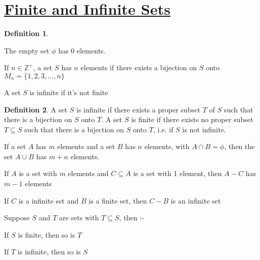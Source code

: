 \documentclass{article}
\theoremstyle{definition}
\newtheorem*{defi}{Definition}
\theoremstyle{definition}
\newenvironment{manualprop}[1]{%
  \renewcommand\themanualpropinner{#1}%
  \manualpropinner
}{\endmanualpropinner}
\theoremstyle{named}
\begin{document}
\section{\underline{Finite and Infinite Sets}}


\begin{defi}
\begin{citemize}
\item The empty set $\phi$ has 0 elements.
\item If $n \in \mathbb{Z^+}$, a set $S$ has $n$ elements if there exists a bijection on $S$ onto $M_n = \{1, 2, 3, ..., n \}$
\item A set $S$ is infinite if it's not finite
\end{citemize}
\end{defi}

\begin{defi}
    A set $S$ is infinite if there exists a
proper subset $T$ of $S$ such that there is a bijection
on $S$ onto $T$. A set $S$ is finite if there exists no
proper subset $T \subseteq S$ such that there is a bijection
on $S$ onto $T$, i.e. if $S$ is not infinite.
\end{defi}

\begin{manualprop}{22}
    
\begin{citemize}
\item If a set $A$ has $m$ elements and a set $B$ has $n$ elements, with $A \cap B = \phi$, then the set $A \cup B$ has $m+n$ elements.

\item If $A$ is a set with $m$ elements and $C \subseteq A$ is a set with 1 element, then $A-C$ has $m-1$ elements
\item  If $C$ is a infinite set and $B$ is a finite set, then $C-B$ is an infinite set

\end{citemize}
\end{manualprop}

\begin{manualprop} {23}
    Suppose $S$ and $T$ are sets with $T \subseteq S$, then :-
    \begin{citemize}
        \item If $S$ is finite, then so is $T$
        \item If $T$ is infinite, then so is $S$
    \end{citemize}
\end{manualprop}
\end{document}
